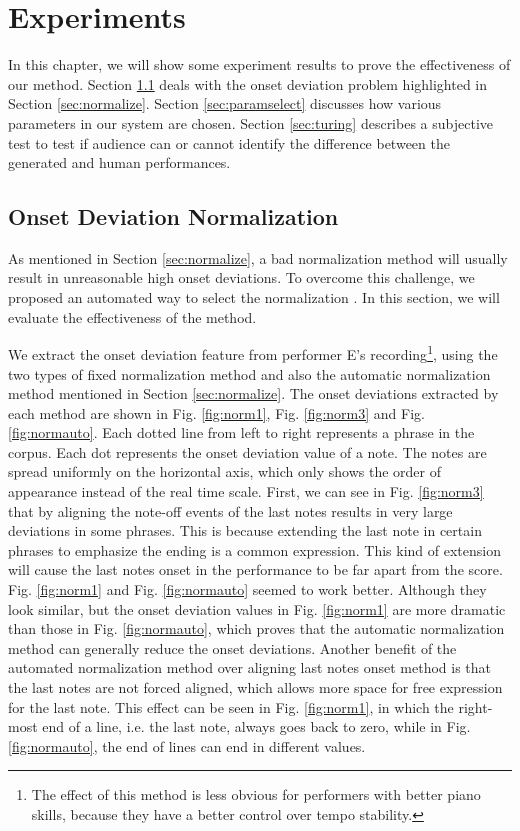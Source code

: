 \chapter{Experiments}
\label{chap:exp}
In this chapter, we will show some experiment results to prove the effectiveness of our method. Section \ref{sec:onsetnormexp} deals with the onset deviation problem highlighted in Section \ref{sec:normalize}. Section \ref{sec:paramselect} discusses how various parameters in our system are chosen. Section \ref{sec:turing} describes a subjective test to test if audience can or cannot identify the difference between the generated and human performances.


\section{Onset Deviation Normalization}
\label{sec:onsetnormexp}
As mentioned in Section \ref{sec:normalize}, a bad normalization method will usually result in unreasonable high onset deviations. To overcome this challenge, we proposed an automated way to select the normalization . In this section, we will evaluate the effectiveness of the method. 

We extract the onset deviation feature from performer E's recording\footnote{The effect of this method is less obvious for performers with better piano skills, because they have a better control over tempo stability.}, using the two types of fixed normalization method and also the automatic normalization method mentioned in Section \ref{sec:normalize}. The onset deviations extracted by each method are shown in Fig. \ref{fig:norm1}, Fig. \ref{fig:norm3} and Fig. \ref{fig:normauto}. Each dotted line from left to right represents a phrase in the corpus. Each dot represents the onset deviation value of a note. The notes are spread uniformly  on the horizontal axis, which only shows the order of appearance instead of the real time scale. First, we can see in Fig. \ref{fig:norm3} that by aligning the note-off events of the last notes results in very large deviations in some phrases. This is because extending the last note in certain phrases to emphasize the ending is a common expression. This kind of extension will cause the last notes onset in the performance to be far apart from the score. Fig. \ref{fig:norm1} and Fig. \ref{fig:normauto} seemed to work better. Although they look similar, but the onset deviation values in Fig. \ref{fig:norm1} are more dramatic than those in Fig. \ref{fig:normauto}, which proves that the automatic normalization method can generally reduce the onset deviations. Another benefit of the automated normalization method over aligning last notes onset method is that the last notes are not forced aligned, which allows more space for free expression for the last note. This effect can be seen in Fig. \ref{fig:norm1}, in which the right-most end of a line, i.e. the last note, always goes back to zero, while in Fig. \ref{fig:normauto}, the end of lines can end in different values.


